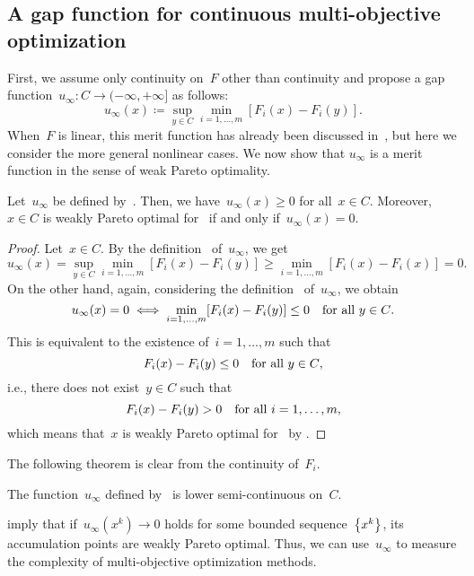 \documentclass[../../main]{subfiles}
\begin{document}
\subsection{A gap function for continuous multi-objective optimization} 
First, we assume only continuity on~$F$ other than continuity and propose a gap function~$u_\infty \colon C \to (-\infty, +\infty]$ as follows:
\begin{equation} \label{eq:gap_MO}
    u_\infty(x) \coloneqq \sup_{y \in C} \min_{i = 1, \dots, m} [ F_i(x) - F_i(y) ] 
.\end{equation}
When~$F$ is linear, this merit function has already been discussed in~\cite{Liu2009}, but here we consider the more general nonlinear cases.
We now show that $u_\infty$ is a merit function in the sense of weak Pareto optimality.
\begin{theorem} 
    Let~$u_\infty$ be defined by~.
    Then, we have~$u_\infty(x) \ge 0$ for all~$x \in C$.
    Moreover,~$x \in C$ is weakly Pareto optimal for~ if and only if~$u_\infty(x) = 0$.
\end{theorem}
\begin{proof}
    Let~$x \in C$.
    By the definition~ of~$u_\infty$, we get
    \begin{equation}
        u_\infty(x) = \sup_{y \in C} \min_{i = 1, \dots, m} [ F_i(x) - F_i(y) ]
                 \ge \min_{i = 1, \dots, m} [ F_i(x) - F_i(x) ] = 0
    .\end{equation} 
    On the other hand, again, considering the definition~ of~$u_\infty$, we obtain
    \begin{equation}
        u_\infty(x) = 0 \iff \min_{i = 1, \dots, m} [ F_i(x) - F_i(y) ] \le 0 \forallcondition{y \in C}
    .\end{equation} 
    This is equivalent to the existence of~$i = 1, \dots, m$ such that
    \begin{equation}
        F_i(x) - F_i(y) \le 0 \forallcondition{y \in C}
    ,\end{equation} 
    i.e., there does not exist~$y \in C$ such that
    \begin{equation}
        F_i(x) - F_i(y) > 0 \forallcondition{i = 1, \dots, m}
    ,\end{equation} 
    which means that~$x$ is weakly Pareto optimal for~ by .
\end{proof}

The following theorem is clear from the continuity of~$F_i$.
\begin{theorem} 
    The function~$u_\infty$ defined by~ is lower semi-continuous on~$C$.
\end{theorem}
 imply that if~$u_\infty\left(x^k\right) \to 0$ holds for some bounded sequence~$\set*{x^k}$, its accumulation points are weakly Pareto optimal.
Thus, we can use~$u_\infty$ to measure the complexity of multi-objective optimization methods.
\end{document}
